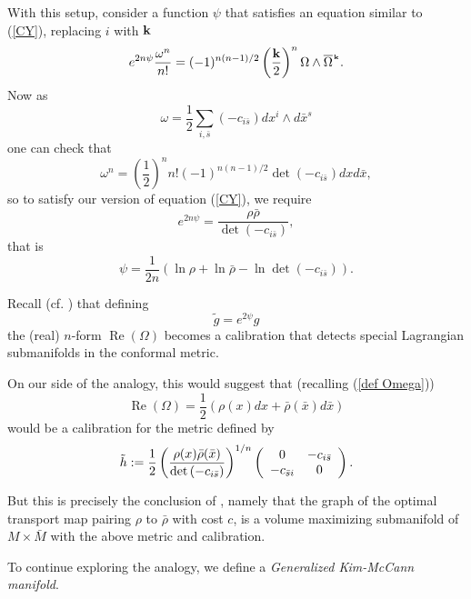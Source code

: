\documentclass[12pt,letterpaper]{amsart}%
\numberwithin{mycounter}{section}
\theoremstyle{plain}
\numberwithin{equation}{section}
\theoremstyle{definition}
\begin{document}
With this setup, consider a function $\psi$ that satisfies an equation similar to (\ref{CY}), replacing $i$ with $\bf{k}$
\begin{equation}
e^{2n\psi}\frac{\omega^{n}}{n!}=(-1)^{n\left(  n-1\right)  /2}\left(
\frac{\mathbf{k}}{2}\right)  ^{n}\Omega\wedge\overline{\Omega}^{_\textrm{\hspace{.03cm}\bf k}}.\label{def:psi_imp}%
\end{equation}
Now as
\[
\omega=\frac{1}{2}\sum_{i,\bar{s}}\left(  -c_{i\bar{s}}\right)  dx^{i}\wedge
d\bar{x}^{s}%
\]
one can check that
\[
\omega^{n}=\left(  \frac{1}{2}\right)  ^{n}n!(-1)^{n(n-1)/2}\det\left(
-c_{i\bar{s}}\right)  dxd\bar{x},
\]
so to satisfy our version of equation (\ref{CY}), we require
\[
e^{2n\psi}=\frac{\rho\bar{\rho}}{\det\left(  -c_{i\bar{s}}\right)  }, 
\] 
that is
\begin{equation}
\psi=\frac{1}{2n}\left(  \ln\rho+\ln\bar{\rho}-\ln\det\left(  -c_{i\bar{s}}\right)  \right).
\label{def:psi}
\end{equation}

Recall  (cf. \cite[pg 166]{Joyce}) that defining 
\[
\tilde{g} = e^{2\psi} g
\]
the (real) $n$-form $\operatorname{Re}(\Omega)$ becomes a calibration that detects special Lagrangian submanifolds in the conformal metric.  

On our side of the analogy, this would suggest that (recalling (\ref{def Omega}))
\[
\operatorname{Re}(\Omega) =\frac{1}{2}\left(  \rho(x)dx+\bar{\rho}(\bar{x})d\bar{x}\right)
\]  
would be a calibration for the metric defined by 
\begin{equation}
\tilde{h}:=\frac{1}{2}\left(  \frac{\rho(x)\bar{\rho}(\bar{x})}{\det\left(
-c_{i\bar{s}}\right)  }\right)  ^{1/n}\left(
\begin{array}
[c]{cc}%
0 & -c_{i\bar{s}}\\
-c_{\bar{s}i} & 0
\end{array}
\right)  . \label{metric}%
\end{equation}

But this is precisely the conclusion of \cite{KMW}, namely that the graph of the optimal transport map pairing $\rho$ to
$\bar{\rho}$ with cost $c$, is a volume maximizing submanifold of $M\times
\bar{M}$ with the above metric and calibration.  


To continue exploring the analogy, we define a \textit{Generalized Kim-McCann manifold}. 
\end{document}
